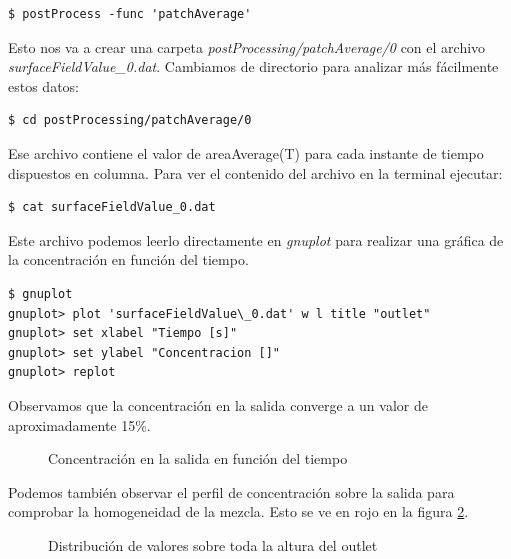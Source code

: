 \documentclass{article}
\begin{document}
\begin{lstlisting}
$ postProcess -func 'patchAverage'
\end{lstlisting}

Esto nos va a crear una carpeta \textit{postProcessing/patchAverage/0} con el archivo \textit{surfaceFieldValue\_0.dat}. Cambiamos de directorio para analizar más fácilmente estos datos:
\begin{lstlisting}
$ cd postProcessing/patchAverage/0
\end{lstlisting}

Ese archivo contiene el valor de areaAverage(T) para cada instante de tiempo dispuestos en columna. Para ver el contenido del archivo en la terminal ejecutar:
\begin{lstlisting}
$ cat surfaceFieldValue_0.dat
\end{lstlisting}

Este archivo podemos leerlo directamente en \textit{gnuplot} para realizar una gráfica de la concentración en función del tiempo.

\begin{lstlisting}
$ gnuplot
gnuplot> plot 'surfaceFieldValue\_0.dat' w l title "outlet"
gnuplot> set xlabel "Tiempo [s]"
gnuplot> set ylabel "Concentracion []"
gnuplot> replot
\end{lstlisting}

Observamos que la concentración en la salida converge a un valor de aproximadamente 15\%.

\newpage
\begin{figure}[h!]
\centering
\caption{Concentración en la salida en función del tiempo}
\label{fig:curva_conc}
\end{figure}

Podemos también observar el perfil de concentración sobre la salida para comprobar la homogeneidad de la mezcla. Esto se ve en rojo en la figura \ref{fig:curvas_outlet}.

\begin{figure}[h!]
	\centering
	\caption{Distribución de valores sobre toda la altura del outlet}
	\label{fig:curvas_outlet}
\end{figure}

\end{document}
